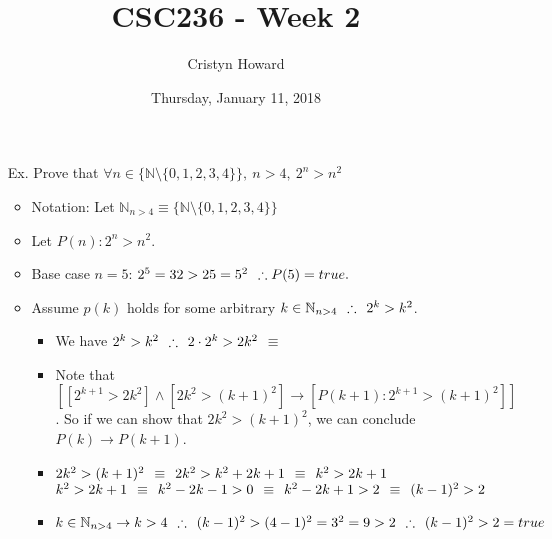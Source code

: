 \documentclass[12pt, oneside]{article}
\title{CSC236 - Week 2}
\author{Cristyn Howard}
\date{Thursday, January 11, 2018}
\newcommand\tab[1][0.15cm]{\hspace*{#1}}
\newcommand\imp{\rightarrow}
\newcommand\thfr{\tab \therefore \tab}
\newcommand\sameas{\tab \equiv \tab}
\begin{document}
\maketitle

\begin{itemize}
\item [Ex.] Prove that $\forall n \in \{\mathbb{N} \setminus\{ 0, 1, 2, 3, 4\}\}, \: n > 4, \: 2^n > n^2$

	\begin{itemize}
	\item Notation: Let $\mathbb{N}_{n>4} \equiv \{\mathbb{N} \setminus\{ 0, 1, 2, 3, 4\}\}$
	\item Let $P(n):  2^n>n^2.$
	
	\item Base case $n=5$: \tab $2^5 = 32 > 25 = 5^2 \tab \therefore P(5) = true.$
	\end{itemize} \vspace{0.7em}
	
 \vspace{0.7em}

	\begin{itemize}
	\item Assume $p(k)$ holds for some arbitrary $k \in \mathbb{N}_{n>4} \thfr 2^k>k^2$.
		
		\begin{itemize}
		\item We have $2^k>k^2 \thfr 2\cdot 2^k>2k^2 \sameas$ 
		
		\item Note that $[[2^{k+1} > 2k^2] \land [2k^2 > (k+1)^2] \imp [P(k+1): 2^{k+1} > (k+1)^2]]$. So if we can show that $2k^2 > (k+1)^2$, we can conclude $P(k) \imp P(k+1)$.
		
		\item $2k^2 > (k+1)^2 \sameas 2k^2 > k^2 + 2k + 1 \sameas k^2 > 2k+1$ \newline
			$k^2 > 2k+1 \sameas k^2-2k-1>0 \sameas k^2-2k+1>2 \sameas (k-1)^2 > 2$
			
		\item $k \in \mathbb{N}_{n>4} \imp k > 4 \thfr (k-1)^2 > (4-1)^2 = 3^2 = 9 > 2 \thfr  (k-1)^2 > 2 = true$ 
		

\end{itemize}
\end{itemize}
\end{itemize}
\end{document}
